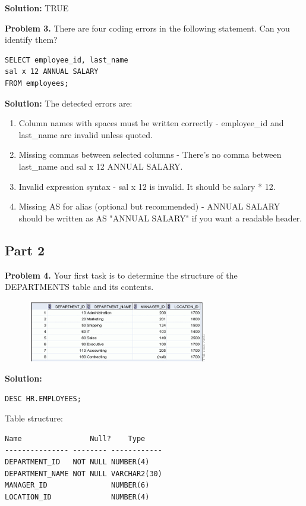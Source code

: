 \documentclass[12pt,a4paper]{article}
\begin{document}
\textbf{Solution:} TRUE

\vspace{0.5cm}

\textbf{Problem 3.} There are four coding errors in the following statement. Can you identify them?
\begin{lstlisting}[style=sqlstyle]
SELECT employee_id, last_name
sal x 12 ANNUAL SALARY
FROM employees;
\end{lstlisting}

\textbf{Solution:}
The detected errors are:
\begin{enumerate}
    \item Column names with spaces must be written correctly - employee\_id and last\_name are invalid unless quoted.
    \item Missing commas between selected columns - There's no comma between last\_name and sal x 12 ANNUAL SALARY.
    \item Invalid expression syntax - sal x 12 is invalid. It should be salary * 12.
    \item Missing AS for alias (optional but recommended) - ANNUAL SALARY should be written as AS "ANNUAL SALARY" if you want a readable header.
\end{enumerate}

\vspace{0.5cm}

\subsection{Part 2}

\textbf{Problem 4.} Your first task is to determine the structure of the DEPARTMENTS table and its contents.
\begin{figure}[htbp]
  \centering
  \includegraphics[width=0.7\textwidth]{Screenshots/14_2.png}
\end{figure}
\textbf{Solution:}
\begin{lstlisting}[style=sqlstyle]
DESC HR.EMPLOYEES;
\end{lstlisting}

Table structure:
\begin{verbatim}
Name                Null?    Type
--------------- -------- ------------
DEPARTMENT_ID   NOT NULL NUMBER(4)
DEPARTMENT_NAME NOT NULL VARCHAR2(30)
MANAGER_ID               NUMBER(6)
LOCATION_ID              NUMBER(4)
\end{verbatim}
\end{document}
